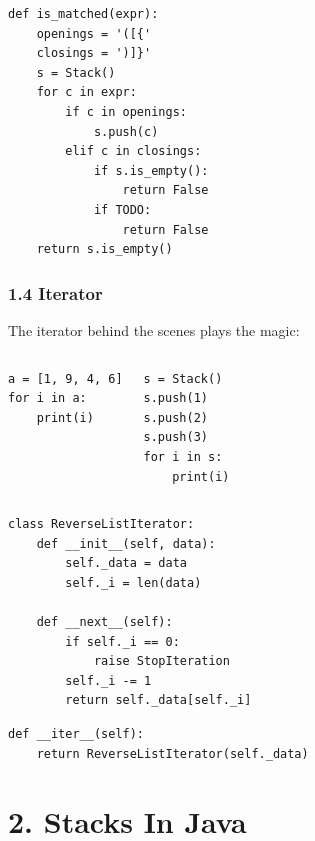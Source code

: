 \documentclass[aspectratio=169, 14pt]{beamer}
\begin{document}
\begin{frame}[fragile]
    \begin{verbatim}
def is_matched(expr):
    openings = '([{'
    closings = ')]}'
    s = Stack()
    for c in expr:
        if c in openings:
            s.push(c)
        elif c in closings:
            if s.is_empty():
                return False
            if TODO:
                return False
    return s.is_empty()
    \end{verbatim}  

\end{frame}

\begin{frame}[fragile]
    \frametitle{1.4 Iterator}
    The \alert{iterator} behind the scenes plays the magic:

    \begin{columns}
        \begin{verbatim}
a = [1, 9, 4, 6]
for i in a:
    print(i)    
    \end{verbatim}
        \begin{verbatim}
s = Stack()
s.push(1)
s.push(2)
s.push(3)
for i in s:
    print(i)
    \end{verbatim}

    \end{columns}
\end{frame}

\begin{frame}[fragile]
    \begin{verbatim}
class ReverseListIterator:
    def __init__(self, data):
        self._data = data
        self._i = len(data)

    def __next__(self):
        if self._i == 0:
            raise StopIteration
        self._i -= 1
        return self._data[self._i]  
    \end{verbatim}

        \begin{verbatim}
def __iter__(self):
    return ReverseListIterator(self._data)        
        \end{verbatim}

\end{frame}

\section{\textcolor{darkmidnightblue}{2. Stacks In Java}}
\end{document}
